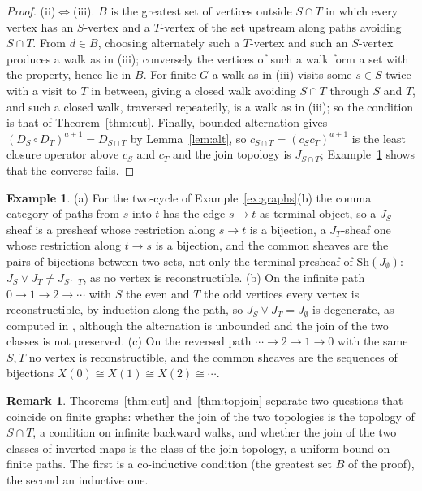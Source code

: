 \documentclass[11pt]{amsart}
\theoremstyle{definition}
\newtheorem{rem}[thm]{Remark}
\newtheorem{ex}[thm]{Example}
\newcommand{\Sh}{\mathrm{Sh}}
\begin{document}
\begin{proof}
(ii)$\Leftrightarrow$(iii). $B$ is the greatest set of vertices outside
$S\cap T$ in which every vertex has an $S$-vertex and a $T$-vertex of the
set upstream along paths avoiding $S\cap T$. From $d\in B$, choosing
alternately such a $T$-vertex and such an $S$-vertex produces a walk as in
(iii); conversely the vertices of such a walk form a set with the
property, hence lie in $B$. For finite $G$ a walk as in (iii) visits some
$s\in S$ twice with a visit to $T$ in between, giving a closed walk
avoiding $S\cap T$ through $S$ and $T$, and such a closed walk, traversed
repeatedly, is a walk as in (iii); so the condition is that of
Theorem~\ref{thm:cut}. Finally, bounded alternation gives
$(D_S\circ D_T)^{a+1}=D_{S\cap T}$ by Lemma~\ref{lem:alt}, so
$c_{S\cap T}=(c_Sc_T)^{a+1}$ is the least closure operator above $c_S$
and $c_T$ and the join topology is $J_{S\cap T}$; Example~\ref{ex:topjoin}
shows that the converse fails.
\end{proof}

\begin{ex}\label{ex:topjoin}
(a) For the two-cycle of Example~\ref{ex:graphs}(b) the comma category
of paths from $s$ into $t$ has the edge $s\to t$ as terminal object, so a
$J_S$-sheaf is a presheaf whose restriction along $s\to t$ is a bijection,
a $J_T$-sheaf one whose restriction along $t\to s$ is a bijection, and the
common sheaves are the pairs of bijections between two sets, not only the
terminal presheaf of $\Sh(J_\emptyset)$: $J_S\vee J_T\ne J_{S\cap T}$,
as no vertex is reconstructible. (b) On the infinite path
$0\to1\to2\to\cdots$ with $S$ the even and $T$ the odd vertices every
vertex is reconstructible, by induction along the path, so $J_S\vee
J_T=J_\emptyset$ is degenerate, as computed in \cite{Topjoin}, although
the alternation is unbounded and the join of the two classes is not
preserved. (c) On the reversed path $\cdots\to2\to1\to0$ with the same
$S,T$ no vertex is reconstructible, and the common sheaves are the
sequences of bijections $X(0)\cong X(1)\cong X(2)\cong\cdots$.
\end{ex}

\begin{rem}
Theorems~\ref{thm:cut} and~\ref{thm:topjoin} separate two questions that
coincide on finite graphs: whether the join of the two topologies is the
topology of $S\cap T$, a condition on infinite backward walks, and
whether the join of the two classes of inverted maps is the class of the
join topology, a uniform bound on finite paths. The first is a
co-inductive condition (the greatest set $B$ of the proof), the second
an inductive one.
\end{rem}
\end{document}
